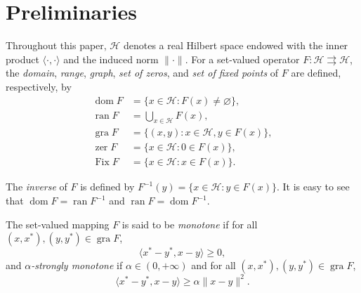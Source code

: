 \documentclass[11pt]{article}
\theoremstyle{definition}
\theoremstyle{definition}
\theoremstyle{definition}
\newcommand{\ran}{\ensuremath{\operatorname{ran}}}
\newcommand{\zer}{\ensuremath{\operatorname{zer}}}
\newcommand{\dom}{\ensuremath{\operatorname{dom}}}
\newcommand{\gra}{\ensuremath{\operatorname{gra}}}
\newcommand{\Fix}{\ensuremath{\operatorname{Fix}}}
\begin{document}
%
%

\section{{Preliminaries }}\label{sec2}

{
Throughout this paper, \( \mathcal{H} \) denotes a real Hilbert space endowed with the inner product \( \langle \cdot, \cdot \rangle \) and the induced norm \( \|\cdot\| \).  For
a set-valued operator \( F : \mathcal{H} \rightrightarrows \mathcal{H} \), the \emph{domain}, \emph{range}, \emph{graph}, \emph{set of zeros}, and \emph{set of fixed points} of \( F \) are defined, respectively, by }
\begin{align*}
\dom F &= \{x \in \mathcal{H} : F(x) \neq \varnothing\}, \\
\ran F &= \bigcup_{x \in \mathcal{H}} F(x), \\
\gra F &= \{(x, y) : x \in \mathcal{H}, y \in F(x)\}, \\
\zer F &= \{x \in \mathcal{H} : 0 \in F(x)\}, \\
\Fix F &= \{x \in \mathcal{H} : x \in F(x)\}.
\end{align*}  

The \emph{inverse} of \( F \) is defined by \( F^{-1}(y) = \{x \in \mathcal{H} : y \in F(x)\} \). It is easy to see that \( \dom F = \ran F^{-1} \) and \( \ran F = \dom F^{-1} \).  

The set-valued mapping \( F \) is said to be \emph{monotone} if for all \( (x, x^*), (y, y^*) \in \gra F \),
\[
\langle x^* - y^*, x - y \rangle \geq 0,
\]
and \emph{\(\alpha\)-strongly monotone} if \( \alpha \in (0, +\infty) \) and for all \( (x, x^*), (y, y^*) \in \gra F \),
\[
\langle x^* - y^*, x - y \rangle \geq \alpha \|x - y\|^2.
\] 
\end{document}
